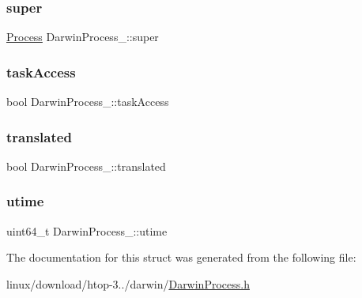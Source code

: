 \subsubsection{\texorpdfstring{super}{super}}
{\footnotesize\ttfamily \hyperlink{Process_8h_a20673e8fa40981a168bf0e196c4cef3b}{Process} Darwin\+Process\+\_\+\+::super}

\mbox{\label{structDarwinProcess___a14f702f4b75cd708adc306b023161cd1}} 
\subsubsection{\texorpdfstring{task\+Access}{taskAccess}}
{\footnotesize\ttfamily bool Darwin\+Process\+\_\+\+::task\+Access}

\mbox{\label{structDarwinProcess___afb0ecb9e0c3b5b2abd79da25bf0e6b81}} 
\subsubsection{\texorpdfstring{translated}{translated}}
{\footnotesize\ttfamily bool Darwin\+Process\+\_\+\+::translated}

\mbox{\label{structDarwinProcess___a0d2964ee33949082bb8cedeb622f4b9f}} 
\subsubsection{\texorpdfstring{utime}{utime}}
{\footnotesize\ttfamily uint64\+\_\+t Darwin\+Process\+\_\+\+::utime}



The documentation for this struct was generated from the following file\+:\begin{DoxyCompactItemize}
\item 
linux/download/htop-\/3../darwin/\hyperlink{DarwinProcess_8h}{Darwin\+Process.\+h}\end{DoxyCompactItemize}
